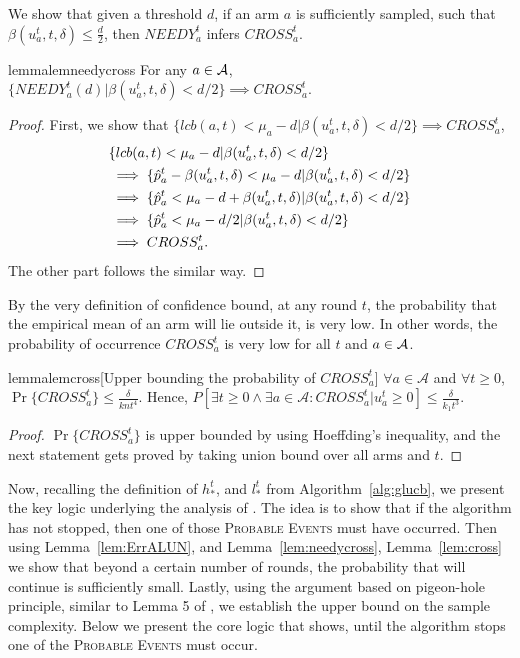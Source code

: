 We show that given a threshold $d$, if an arm $a$ is sufficiently sampled, such that $\beta(u_a^t, t, \delta) \leq \frac{d}{2}$, then $NEEDY_a^t$ infers $CROSS_a^t$.


\begin{restatable}{lemma}{lemneedycross}
 \label{lem:needycross}
  For any $a \in \mathcal{A}$, $\{NEEDY_a^t(d)|\beta(u_a^t, t, \delta) < d/2\} \implies CROSS_a^t$.
\end{restatable}

\begin{proof}
 First, we show that $\{lcb(a,t) < \mu_a -d | \beta(u_a^t, t, \delta) < d/2\} \implies CROSS_a^t$,
 \begin{align}
  & \{lcb(a,t) < \mu_a -d | \beta(u_a^t, t, \delta) < d/2\} \nonumber\\
  & \implies \{\hat{p}_a^t - \beta(u_a^t, t, \delta) < \mu_a -d | \beta(u_a^t, t, \delta) < d/2\} \nonumber\\
  & \implies \{\hat{p}_a^t < \mu_a -d +\beta(u_a^t, t, \delta) | \beta(u_a^t, t, \delta) < d/2\} \nonumber\\
  & \implies \{\hat{p}_a^t < \mu_a -d/2 | \beta(u_a^t, t, \delta) < d/2\} \nonumber\\
  & \implies CROSS_a^t.
 \end{align}
 The other part follows the similar way.
\end{proof}

By the very definition of confidence bound, at any round $t$, the probability that
the empirical mean of an arm will lie outside it, is very low. In other words, the
probability of occurrence $CROSS_a^t$ is very low for all $t$ and $a \in \mathcal{A}$.

\begin{restatable}{lemma}{lemcross}[Upper bounding the probability of $CROSS_a^t$]
 \label{lem:cross}
 $\forall a \in \mathcal{A}$ and $\forall t \geq 0$, $\Pr\{{CROSS_a^t}\}  \leq  \frac{\delta}{knt^4}$. Hence,
 $P\left[\exists t \geq 0  \wedge \exists a \in \mathcal{A} : {CROSS_a^t} | u_a^t \geq 0  \right] \leq  \frac{\delta}{k_1 t^3}.$
\end{restatable}
\begin{proof}
$\Pr\{{CROSS_a^t}\}$ is upper bounded by using Hoeffding's inequality, and the next statement
gets proved by taking union bound over all arms and $t$.
\end{proof}
Now, recalling the definition of $h_*^t$, and $l_*^t$ from Algorithm~\ref{alg:glucb},
we present the key logic underlying the analysis of \GLUCB. The idea is to show that
if the algorithm has not stopped, then one of those \textsc{Probable Events} must have
occurred. Then using Lemma~\ref{lem:ErrALUN},
 and Lemma~\ref{lem:needycross}, Lemma~\ref{lem:cross}
we show that beyond a certain number of rounds, the probability that \GLUCB
will continue is sufficiently small.
Lastly, using the argument based on pigeon-hole principle, similar to
Lemma 5 of 
\citet{bib:shivaramphdthesis}, we establish the upper bound on the 
sample complexity. Below we present the core logic that shows, until the algorithm stops one of the
\textsc{Probable Events} must occur.


